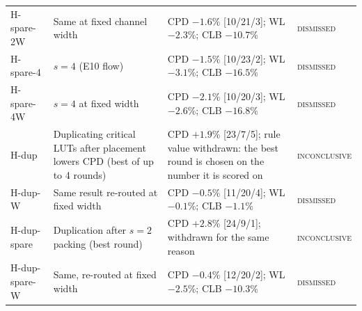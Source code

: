 \begin{table}[t]
\begin{tabular}{@{}p{0.75in}p{2.2in}p{3.0in}p{0.8in}@{}}
H-spare-2W & Same at fixed channel width & CPD $-1.6$\% [10/21/3]; WL $-2.3$\%; CLB $-10.7$\% & \textsc{dismissed} \\
H-spare-4 & $s=4$ (E10 flow) & CPD $-1.5$\% [10/23/2]; WL $-3.1$\%; CLB $-16.5$\% & \textsc{dismissed} \\
H-spare-4W & $s=4$ at fixed width & CPD $-2.1$\% [10/20/3]; WL $-2.6$\%; CLB $-16.8$\% & \textsc{dismissed} \\
H-dup & Duplicating critical LUTs after placement lowers CPD (best of up to 4 rounds) & CPD $+1.9$\% [23/7/5]; rule value withdrawn: the best round is chosen on the number it is scored on & \textsc{inconclusive} \\
H-dup-W & Same result re-routed at fixed width & CPD $-0.5$\% [11/20/4]; WL $-0.1$\%; CLB $-1.1$\% & \textsc{dismissed} \\
H-dup-spare & Duplication after $s=2$ packing (best round) & CPD $+2.8$\% [24/9/1]; withdrawn for the same reason & \textsc{inconclusive} \\
H-dup-spare-W & Same, re-routed at fixed width & CPD $-0.4$\% [12/20/2]; WL $-2.5$\%; CLB $-10.3$\% & \textsc{dismissed} \\
\bottomrule
\end{tabular}
\end{table}
